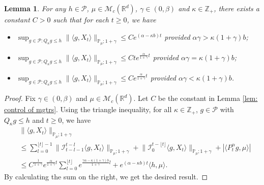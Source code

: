 \documentclass[12pt,a4paper]{amsart}
\theoremstyle{plain}
\newtheorem{lem}[thm]{Lemma}
\theoremstyle{definition}
\numberwithin{equation}{section}
\begin{document}
\begin{lem}
\label{lem: control moment}
    For any $h \in \mathcal P$, $\mu \in \mathcal M_c(\mathbb R^d)$, $\gamma\in (0, \beta)$ and $\kappa \in \mathbb Z_+$, there exists a constant $C > 0$ such that for each $t\geq 0$, we have
\begin{itemize}
\item[(1)]
    $\sup_{g\in \mathcal P: Q_\kappa g \leq h}\|\langle g,X_t\rangle\|_{\mathbb{P}_{\mu};1+\gamma}\leq C e^{(\alpha-\kappa b)t}$ provided $\alpha\gamma > \kappa (1+\gamma)b$;
\item[(2)]
    $\sup_{g\in \mathcal P: Q_\kappa g \leq h}\|\langle g,X_t\rangle\|_{\mathbb{P}_{\mu};1+\gamma}\leq C te^{\frac{\alpha}{1+\gamma}t}$ provided $\alpha\gamma = \kappa (1+\gamma)b$;
\item[(3)]
    $\sup_{g\in \mathcal P: Q_\kappa g \leq h} \|\langle g,X_t\rangle\|_{\mathbb{P}_{\mu};1+\gamma}\leq C e^{\frac{\alpha}{1+\gamma}t}$ provided $\alpha\gamma < \kappa (1+\gamma)b$.
\end{itemize}
\end{lem}
\begin{proof}
    Fix $\gamma \in (0,\beta)$ and $\mu \in \mathcal M_c(\mathbb R^d)$.
    Let $C$ be the constant in Lemma \ref{lem: control of mgtrs}.
    Using the triangle inequality, for all $\kappa\in \mathbb Z_+$, $g \in \mathcal P$ with $Q_\kappa g \leq h$ and $t\geq 0$, we have
\begin{equation}\begin{split}
    &\|\langle g,X_t\rangle\|_{\mathbb P_\mu;1+\gamma}
    \\ &\leq \sum_{l=0}^{\lfloor t\rfloor - 1}\big\| \mathcal{I}_{t-l-1}^{t-l}\langle g,X_t\rangle \big\|_{\mathbb P_\mu;1+\gamma}+\big\| \mathcal{I}_{0}^{t-\lfloor t \rfloor}\langle g,X_t\rangle  \big\|_{\mathbb P_\mu;1+\gamma}
    + |\langle P^\alpha_t g,\mu\rangle|
    \\ &\leq C^{\frac{1}{1+\gamma}} e^{\frac{\alpha}{1+\gamma}t} \sum_{l=0}^{\lfloor t\rfloor} e^{\frac{\gamma\alpha-\kappa (1+\gamma)b}{1+\gamma} l} + e^{(\alpha - \kappa b)t} \langle h,\mu\rangle.
\end{split}\end{equation}
    By calculating the sum on the right, we get the desired result.
\end{proof}
\end{document}
